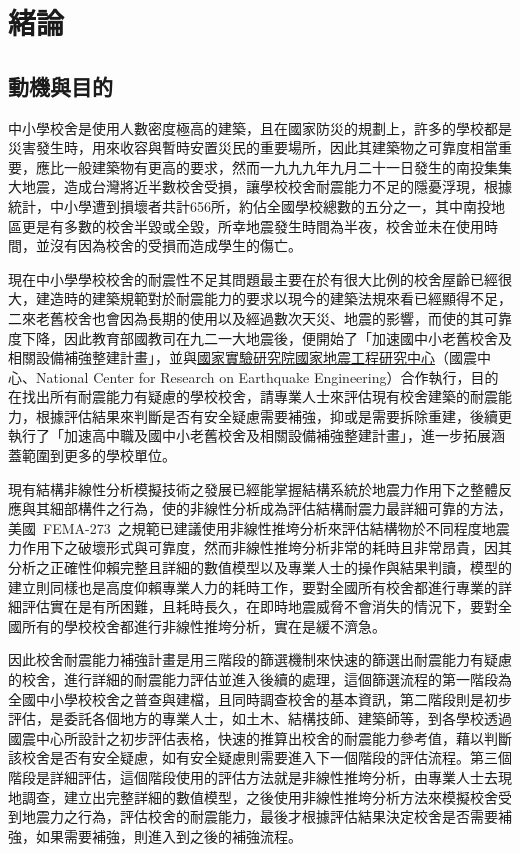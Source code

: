 % 
\chapter{緒論}
\label{cha:intro} 

\section{動機與目的}

中小學校舍是使用人數密度極高的建築，且在國家防災的規劃上，許多的學校都是災害發生時，用來收容與暫時安置災民的重要場所，因此其建築物之可靠度相當重要，應比一般建築物有更高的要求，然而一九九九年九月二十一日發生的南投集集大地震，造成台灣將近半數校舍受損，讓學校校舍耐震能力不足的隱憂浮現，根據統計，中小學遭到損壞者共計656所，約佔全國學校總數的五分之一，其中南投地區更是有多數的校舍半毀或全毀，所幸地震發生時間為半夜，校舍並未在使用時間，並沒有因為校舍的受損而造成學生的傷亡。

現在中小學學校校舍的耐震性不足其問題最主要在於有很大比例的校舍屋齡已經很大，建造時的建築規範對於耐震能力的要求以現今的建築法規來看已經顯得不足，二來老舊校舍也會因為長期的使用以及經過數次天災、地震的影響，而使的其可靠度下降，因此教育部國教司在九二一大地震後，便開始了「加速國中小老舊校舍及相關設備補強整建計畫」，並與\underline{國家實驗研究院國家地震工程研究中心}（國震中心、National Center for Research on Earthquake Engineering）合作執行，目的在找出所有耐震能力有疑慮的學校校舍，請專業人士來評估現有校舍建築的耐震能力，根據評估結果來判斷是否有安全疑慮需要補強，抑或是需要拆除重建，後續更執行了「加速高中職及國中小老舊校舍及相關設備補強整建計畫」，進一步拓展涵蓋範圍到更多的學校單位。

現有結構非線性分析模擬技術之發展已經能掌握結構系統於地震力作用下之整體反應與其細部構件之行為，使的非線性分析成為評估結構耐震力最詳細可靠的方法，美國~FEMA-273\cite{building1997nehrp}~之規範已建議使用非線性推垮分析來評估結構物於不同程度地震力作用下之破壞形式與可靠度，然而非線性推垮分析非常的耗時且非常昂貴，因其分析之正確性仰賴完整且詳細的數值模型以及專業人士的操作與結果判讀，模型的建立則同樣也是高度仰賴專業人力的耗時工作，要對全國所有校舍都進行專業的詳細評估實在是有所困難，且耗時長久，在即時地震威脅不會消失的情況下，要對全國所有的學校校舍都進行非線性推垮分析，實在是緩不濟急。

因此校舍耐震能力補強計畫是用三階段的篩選機制來快速的篩選出耐震能力有疑慮的校舍，進行詳細的耐震能力評估並進入後續的處理，這個篩選流程的第一階段為全國中小學校校舍之普查與建檔，且同時調查校舍的基本資訊，第二階段則是初步評估，是委託各個地方的專業人士，如土木、結構技師、建築師等，到各學校透過國震中心所設計之初步評估表格，快速的推算出校舍的耐震能力參考值，藉以判斷該校舍是否有安全疑慮，如有安全疑慮則需要進入下一個階段的評估流程。第三個階段是詳細評估，這個階段使用的評估方法就是非線性推垮分析，由專業人士去現地調查，建立出完整詳細的數值模型，之後使用非線性推垮分析方法來模擬校舍受到地震力之行為，評估校舍的耐震能力，最後才根據評估結果決定校舍是否需要補強，如果需要補強，則進入到之後的補強流程。

